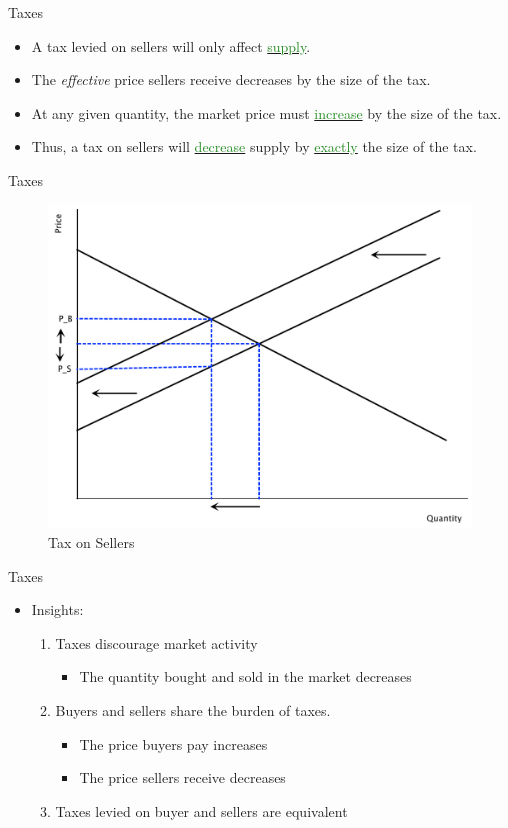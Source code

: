 \documentclass[xcolor={dvipsnames},pdf, hyperref={colorlinks=true, citecolor=ForestGreen, linkcolor=BlueViolet, urlcolor=Magenta}]{beamer}
\newcommand{\dd}[1]{{\underline{\textcolor{ForestGreen}{#1}}}}
\begin{document}
\begin{frame}{Taxes}
	\begin{itemize}
		\item A tax levied on sellers will only affect \dd{supply}. 
		\item The \textit{effective} price sellers receive decreases by the size of the tax. 
		\item At any given quantity, the market price must \dd{increase} by the size of the tax.
		\item Thus, a tax on sellers will \dd{decrease} supply by \dd{exactly} the size of the tax.

	\end{itemize}
\end{frame}

\begin{frame}{Taxes}
		\begin{figure}
		\includegraphics[scale=.30]{plot40.pdf}
			\caption{Tax on Sellers}
		\end{figure}
\end{frame}

\begin{frame}{Taxes}
	\begin{itemize}
		\item Insights:
		\begin{enumerate}
			\item Taxes discourage market activity
			\begin{itemize}
				\item The quantity bought and sold in the market decreases
			\end{itemize}
			\item Buyers and sellers share the burden of taxes. 
				\begin{itemize}
					\item The price buyers pay increases
					\item The price sellers receive decreases
				\end{itemize} 
			\item Taxes levied on buyer and sellers are equivalent
		\end{enumerate}
	\end{itemize}
\end{frame}
\end{document}
